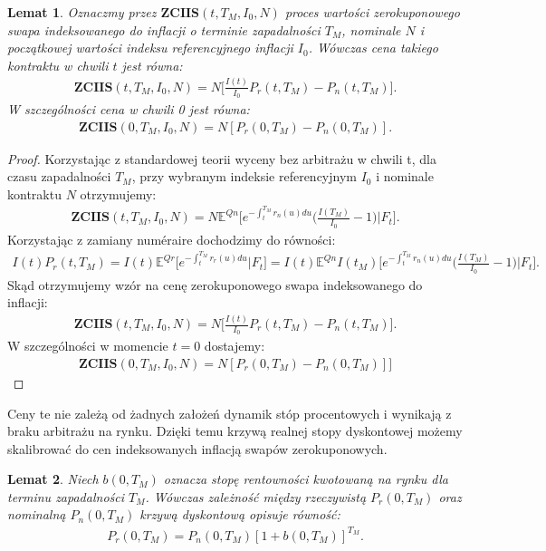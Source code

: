 \documentclass{mini}
\theoremstyle{mythstyle}
\newtheorem{Lemat}{Lemat}[chapter]
\begin{document}
	\begin{Lemat}
		Oznaczmy przez $\textbf{ZCIIS}(t,T_M,I_0,N)$ proces wartości zerokuponowego swapa indeksowanego do inflacji o terminie zapadalności $T_M$, nominale $N$ i początkowej wartości indeksu referencyjnego inflacji $I_0$. Wówczas cena takiego kontraktu w chwili $t$ jest równa:
		\begin{eqnarray}
			\textbf{ZCIIS} (t,T_M,I_0,N) = N \bigg[\frac{I(t)}{I_0} P_r(t,T_M) - P_n(t,T_M)\bigg].
		\end{eqnarray}
		W szczególności cena w chwili 0 jest równa:
		\begin{eqnarray}
			\textbf{ZCIIS} (0,T_M,I_0,N) = N [P_r(0,T_M) - P_n(0,T_M)].
		\end{eqnarray}
	\end{Lemat}
	\begin{proof}
	Korzystając z standardowej teorii wyceny bez arbitrażu w chwili t, dla czasu zapadalności $T_M$, przy wybranym indeksie referencyjnym $I_0$ i nominale kontraktu $N$ otrzymujemy:
	\begin{eqnarray}
		\textbf{ZCIIS} (t,T_M,I_0,N) = N \mathbb{E}^{Qn} \bigg[e^{-\int_t^{T_M}r_n(u)du}\bigg(\frac{I(T_M)}{I_0}-1\bigg) \bigg| F_t\bigg].
	\end{eqnarray}
	Korzystając z zamiany num\'{e}raire dochodzimy do równości:
	\begin{eqnarray*}
		I(t) P_r (t,T_M) = I(t) \mathbb{E}^{Qr} \bigg[e^{-\int_t^{T_M}r_r(u)du} \bigg| F_t\bigg] = I(t) \mathbb{E}^{Qn} I(t_M) \bigg[e^{-\int_t^{T_M}r_n(u)du}\bigg(\frac{I(T_M)}{I_0}-1\bigg) \bigg| F_t\bigg].
	\end{eqnarray*}
	Skąd otrzymujemy wzór na cenę zerokuponowego swapa indeksowanego do inflacji:
	\begin{eqnarray}
		\textbf{ZCIIS} (t,T_M,I_0,N) = N \bigg[\frac{I(t)}{I_0} P_r(t,T_M) - P_n(t,T_M)\bigg].
	\end{eqnarray}
	W szczególności w momencie $t = 0$ dostajemy:
	\begin{eqnarray}
		\textbf{ZCIIS} (0,T_M,I_0,N) = N [P_r(0,T_M) - P_n(0,T_M)]]
	\end{eqnarray}
	\end{proof}
	Ceny te nie zależą od żadnych założeń dynamik stóp procentowych i wynikają z braku arbitrażu na rynku. Dzięki temu krzywą realnej stopy dyskontowej możemy skalibrować do cen indeksowanych inflacją swapów zerokuponowych. \\
	\begin{Lemat}
		Niech $b(0,T_M)$ oznacza stopę rentowności kwotowaną na rynku dla terminu zapadalności $T_M$. Wówczas zależność między rzeczywistą $P_r(0,T_M)$ oraz nominalną $P_n(0,T_M)$ krzywą dyskontową opisuje równość:
		\begin{eqnarray}
		P_r(0,T_M) = P_n(0,T_M)[1 + b(0,T_M)]^{T_M}.
		\end{eqnarray}
	\end{Lemat}
\end{document}
